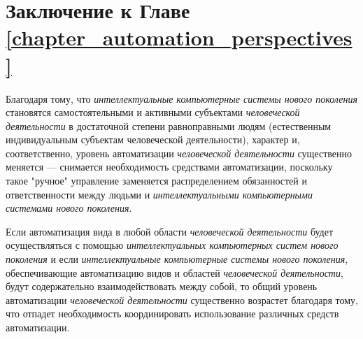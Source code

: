 \begin{comment}
		Решение указанных проблем становится вполне возможным, если для этого использовать \textit{интеллектуальные компьютерные системы нового поколения}, с помощью которых накапливаемые человечеством \textit{знания} и \textit{навыки} будут организованы как систематизированная распределенная библиотека многократно используемых информационных ресурсов (\textit{знаний} и \textit{навыков}).}
	\begin{scnindent}
		\scntext{следовательно}{Систематизация и автоматизация многократного использования накапливаемых человечеством информационных ресурсов требует их конвергенции, глубокой интеграции и формализации. Особое место в этом процессе занимает математика, как основа систематизации и формализации знаний и навыков на уровне формальных \textit{онтологий верхнего уровня}.}
	\end{scnindent}
	
\end{SCn}
\end{comment}

\section*{Заключение к Главе \ref{chapter_automation_perspectives}}

Благодаря тому, что \textit{интеллектуальные компьютерные системы нового поколения} становятся самостоятельными и активными субъектами \textit{человеческой деятельности} в достаточной степени равноправными людям (естественным индивидуальным субъектам человеческой деятельности), характер и, соответственно, уровень автоматизации \textit{человеческой деятельности} существенно меняется --- снимается необходимость  средствами автоматизации, поскольку такое "ручное"{} управление заменяется распределением обязанностей и ответственности между людьми и \textit{интеллектуальными компьютерными системами нового поколения}.

Если автоматизация  вида в любой области \textit{человеческой деятельности} будет осуществляться с помощью \textit{интеллектуальных компьютерных систем нового поколения} и если \textit{интеллектуальные компьютерные системы нового поколения}, обеспечивающие автоматизацию  видов и областей \textit{человеческой деятельности}, будут содержательно взаимодействовать между собой, то общий уровень автоматизации \textit{человеческой деятельности} существенно возрастет благодаря тому, что отпадет необходимость  координировать использование различных средств автоматизации.

